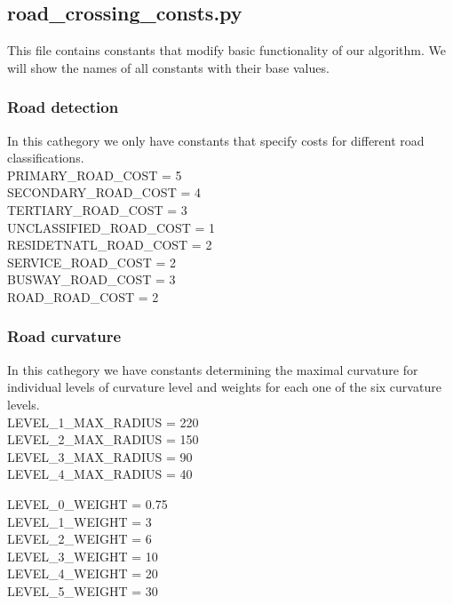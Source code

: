 \documentclass[oneside]{article}
\begin{document}
        \subsection{road\_crossing\_consts.py}
        \label{sec:const}
        This file contains constants that modify basic functionality of our algorithm. We will show the names of all constants with their base values.

            \subsubsection{Road detection}
            In this cathegory we only have constants that specify costs for different road classifications.\\
            PRIMARY\_ROAD\_COST = 5\\
            SECONDARY\_ROAD\_COST = 4\\
            TERTIARY\_ROAD\_COST = 3\\
            UNCLASSIFIED\_ROAD\_COST = 1\\
            RESIDETNATL\_ROAD\_COST = 2\\
            SERVICE\_ROAD\_COST = 2\\
            BUSWAY\_ROAD\_COST = 3\\
            ROAD\_ROAD\_COST = 2

            \subsubsection{Road curvature}
            In this cathegory we have constants determining the maximal curvature for individual levels of curvature level and weights for each one of the six curvature levels.\\
            LEVEL\_1\_MAX\_RADIUS = 220\\
            LEVEL\_2\_MAX\_RADIUS = 150\\
            LEVEL\_3\_MAX\_RADIUS = 90\\
            LEVEL\_4\_MAX\_RADIUS = 40

            \vspace{5mm}

            \noindent LEVEL\_0\_WEIGHT = 0.75\\
            LEVEL\_1\_WEIGHT = 3\\
            LEVEL\_2\_WEIGHT = 6\\
            LEVEL\_3\_WEIGHT = 10\\
            LEVEL\_4\_WEIGHT = 20\\
            LEVEL\_5\_WEIGHT = 30
\end{document}
